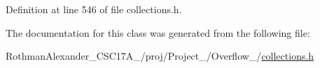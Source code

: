 Definition at line 546 of file collections.\+h.



The documentation for this class was generated from the following file\+:\begin{DoxyCompactItemize}
\item 
Rothman\+Alexander\+\_\+\+C\+S\+C17\+A\+\_/proj/\+Project\+\_/\+Overflow\+\_/\hyperlink{collections_8h}{collections.\+h}\end{DoxyCompactItemize}
